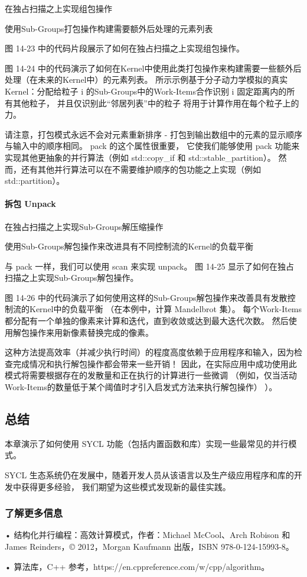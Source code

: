 {\color{red} 在独占扫描之上实现组包操作}

{\color{red} 使用Sub-Groups打包操作构建需要额外后处理的元素列表}

图 14-23 中的代码片段展示了如何在独占扫描之上实现组包操作。

图 14-24 中的代码演示了如何在Kernel中使用此类打包操作来构建需要一些额外后处理（在未来的Kernel中）的元素列表。 
所示示例基于分子动力学模拟的真实Kernel：分配给粒子 i 的Sub-Groups中的Work-Items合作识别 i 固定距离内的所有其他粒子，
并且仅识别此“邻居列表”中的粒子 将用于计算作用在每个粒子上的力。

请注意，打包模式永远不会对元素重新排序 - 打包到输出数组中的元素的显示顺序与输入中的顺序相同。 
pack 的这个属性很重要，
它使我们能够使用 pack 功能来实现其他更抽象的并行算法（例如 std::copy\_if 和 std::stable\_partition）。 
然而，还有其他并行算法可以在不需要维护顺序的包功能之上实现（例如 std::partition）。

\paragraph{拆包 Unpack}

{\color{red} 在独占扫描之上实现Sub-Groups解压缩操作}

{\color{red} 使用Sub-Groups解包操作来改进具有不同控制流的Kernel的负载平衡}

与 pack 一样，我们可以使用 scan 来实现 unpack。 图 14-25 显示了如何在独占扫描之上实现Sub-Groups解包操作。

图 14-26 中的代码演示了如何使用这样的Sub-Groups解包操作来改善具有发散控制流的Kernel中的负载平衡
（在本例中，计算 Mandelbrot 集）。 每个Work-Items都分配有一个单独的像素来计算和迭代，直到收敛或达到最大迭代次数。 
然后使用解包操作来用新像素替换完成的像素。

这种方法提高效率（并减少执行时间）的程度高度依赖于应用程序和输入，因为检查完成情况和执行解包操作都会带来一些开销！ 
因此，在实际应用中成功使用此模式将需要根据存在的发散量和正在执行的计算进行一些微调
（例如，仅当活动Work-Items的数量低于某个阈值时才引入启发式方法来执行解包操作） ）。

\subsection{总结}
本章演示了如何使用 SYCL 功能（包括内置函数和库）实现一些最常见的并行模式。

SYCL 生态系统仍在发展中，随着开发人员从该语言以及生产级应用程序和库的开发中获得更多经验，
我们期望为这些模式发现新的最佳实践。

\subsubsection{了解更多信息}
• 结构化并行编程：高效计算模式，作者：Michael McCool、Arch Robison 
和 James Reinders，© 2012，Morgan Kaufmann 出版，ISBN 978-0-124-15993-8。

• 算法库，C++ 参考，https://en.cppreference.com/w/cpp/algorithm。
